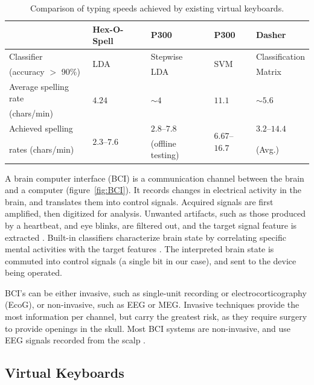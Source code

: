 \documentclass[12pt,titlepage]{article}
\begin{document}
\begin{table}
\caption{Comparison of typing speeds achieved by existing virtual keyboards.}
\begin{center}
\begin{tabular}{lllll}
\hline\hline
& Hex-O-Spell & P300 & P300 & Dasher\\
\hline
Classifier & \multirow{2}{*}{LDA} & Stepwise & \multirow{2}{*}{SVM} & Classification \\
\quad (accuracy $>$ 90\%) & & LDA  & & Matrix \\
Average spelling rate & \multirow{2}{*}{$4.24$} & \multirow{2}{*}{$\sim4$} & \multirow{2}{*}{$11.1$} & \multirow{2}{*}{$\sim5.6$} \\
\quad (chars/min) & & & & \\
Achieved spelling & \multirow{2}{*}{$2.3$--$7.6$} & $2.8$--$7.8$ & \multirow{2}{*}{$6.67$--$16.7$} & $3.2$--$14.4$ \\
\quad rates (chars/min) & & (offline testing) & & (Avg.) \\
\hline\hline
\end{tabular}
\end{center}
\label{table:BCIComp}
\end{table}

A brain computer interface (BCI) is a communication channel between the brain and a 
computer (figure~\ref{fig:BCI}). It records changes in electrical activity in the brain, and translates them into 
control signals.  Acquired signals are first amplified, then digitized for analysis.  Unwanted 
artifacts, such as those produced by a heartbeat, and eye blinks, are filtered out, and the target signal
feature is extracted \cite{lotte_review_2007}.   Built-in classifiers characterize brain state by correlating specific mental 
activities with the target features \cite{lotte_review_2007}.  The interpreted brain state is commuted into control signals (a single bit in our case), and sent to the device being operated.

BCI's can be either invasive, such as single-unit recording or electrocorticography (EcoG), or 
non-invasive, such as EEG or MEG.  Invasive techniques provide the most information per 
channel, but carry the greatest risk, as they require surgery to provide openings in the skull. 
Most BCI systems are non-invasive, and use EEG signals recorded from the scalp \cite{guger_design_1999}.

\subsection{Virtual Keyboards} %
\end{document}
